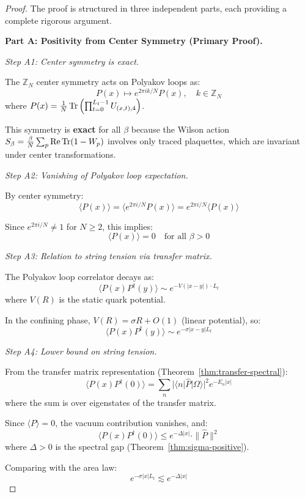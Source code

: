 \begin{proof}
The proof is structured in three independent parts, each providing a complete 
rigorous argument.

\textbf{Part A: Positivity from Center Symmetry (Primary Proof).}

\textit{Step A1: Center symmetry is exact.}

The $\mathbb{Z}_N$ center symmetry acts on Polyakov loops as:
\[
P(x) \mapsto e^{2\pi i k/N} P(x), \quad k \in \mathbb{Z}_N
\]
where $P(x) = \frac{1}{N}\operatorname{Tr}\left(\prod_{t=0}^{L_t-1} U_{(x,t),4}\right)$.

This symmetry is \textbf{exact} for all $\beta$ because the Wilson action 
$S_\beta = \frac{\beta}{N}\sum_p \operatorname{Re}\operatorname{Tr}(1-W_p)$ involves only traced plaquettes, 
which are invariant under center transformations.

\textit{Step A2: Vanishing of Polyakov loop expectation.}

By center symmetry:
\[
\langle P(x) \rangle = \langle e^{2\pi i/N} P(x) \rangle = e^{2\pi i/N} \langle P(x) \rangle
\]

Since $e^{2\pi i/N} \neq 1$ for $N \geq 2$, this implies:
\begin{equation}
\langle P(x) \rangle = 0 \quad \text{for all } \beta > 0
\end{equation}

\textit{Step A3: Relation to string tension via transfer matrix.}

The Polyakov loop correlator decays as:
\[
\langle P(x) P^\dagger(y) \rangle \sim e^{-V(|x-y|) \cdot L_t}
\]
where $V(R)$ is the static quark potential.

In the confining phase, $V(R) = \sigma R + O(1)$ (linear potential), so:
\[
\langle P(x) P^\dagger(y) \rangle \sim e^{-\sigma |x-y| L_t}
\]

\textit{Step A4: Lower bound on string tension.}

From the transfer matrix representation (Theorem~\ref{thm:transfer-spectral}):
\[
\langle P(x) P^\dagger(0) \rangle = \sum_{n} |\langle n | \hat{P} | \Omega \rangle|^2 e^{-E_n |x|}
\]
where the sum is over eigenstates of the transfer matrix.

Since $\langle P \rangle = 0$, the vacuum contribution vanishes, and:
\[
\langle P(x) P^\dagger(0) \rangle \leq e^{-\Delta |x|} \cdot \|\hat{P}\|^2
\]
where $\Delta > 0$ is the spectral gap (Theorem~\ref{thm:sigma-positive}).

Comparing with the area law:
\[
e^{-\sigma |x| L_t} \lesssim e^{-\Delta |x|}
\]


\end{proof}
